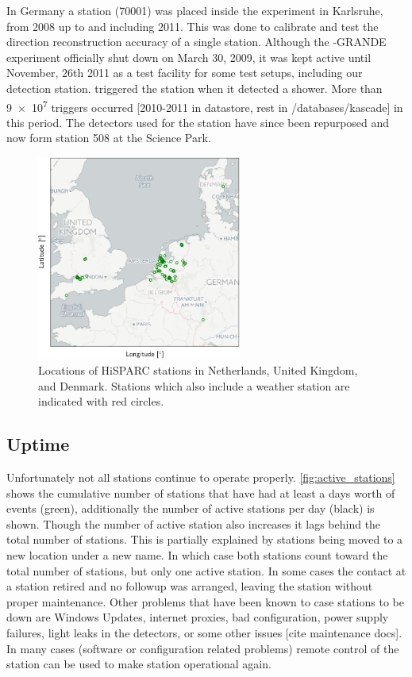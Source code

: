 In Germany a station (70001) was placed inside the \kascade experiment in Karlsruhe, from 2008 up to and including 2011. This was done to calibrate and test the direction reconstruction accuracy of a single \hisparc station. Although the \kascade-GRANDE experiment officially shut down on March 30, 2009, it was kept active until November, 26th 2011 as a test facility for some test setups, including our detection station. \kascade triggered the \hisparc station when it detected a shower. More than \num{9e7} triggers occurred [2010-2011 in datastore, rest in /databases/kascade] in this period. The detectors used for the \kascade station have since been repurposed and now form station 508 at the Science Park.

\begin{figure}
    \centering
    \includegraphics[width=0.6\textwidth]
                    {plots/cluster/network}
    \caption{Locations of HiSPARC stations in Netherlands, United Kingdom, and Denmark. Stations which also include a weather station are indicated with red circles.}
    \label{fig:network}
\end{figure}


\subsection{Uptime}

Unfortunately not all stations continue to operate properly. \cref{fig:active_stations} shows the cumulative number of stations that have had at least a days worth of events (green), additionally the number of active stations per day (black) is shown. Though the number of active station also increases it lags behind the total number of stations. This is partially explained by stations being moved to a new location under a new name. In which case both stations count toward the total number of stations, but only one active station. In some cases the contact at a station retired and no followup was arranged, leaving the station without proper maintenance. Other problems that have been known to case stations to be down are Windows Updates, internet proxies, bad configuration, power supply failures, light leaks in the detectors, or some other issues [cite maintenance docs]. In many cases (software or configuration related problems) remote control of the station can be used to make station operational again.

